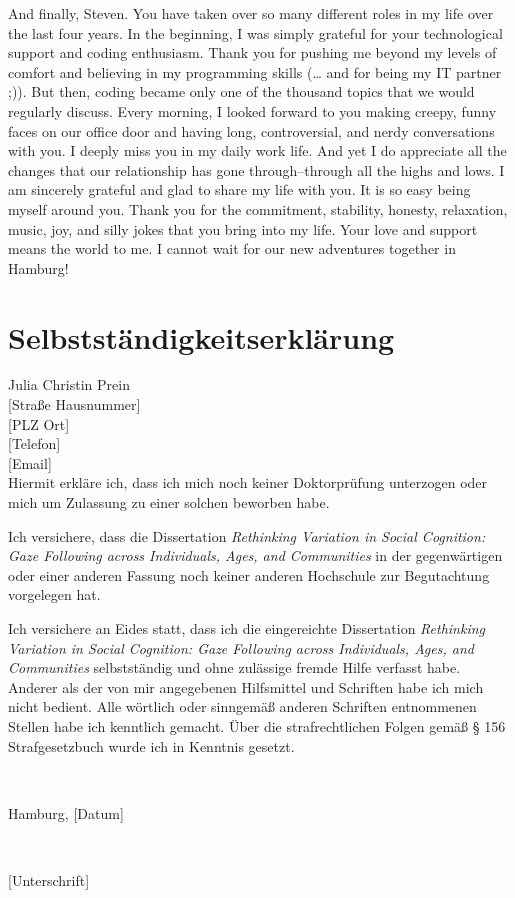 \documentclass[
]{scrbook}
\begin{document}
And finally, Steven. You have taken over so many different roles in my life over the last four years. In the beginning, I was simply grateful for your technological support and coding enthusiasm. Thank you for pushing me beyond my levels of comfort and believing in my programming skills (\ldots{} and for being my IT partner ;)). But then, coding became only one of the thousand topics that we would regularly discuss. Every morning, I looked forward to you making creepy, funny faces on our office door and having long, controversial, and nerdy conversations with you. I deeply miss you in my daily work life. And yet I do appreciate all the changes that our relationship has gone through\thinspace --\thinspace through all the highs and lows. I am sincerely grateful and glad to share my life with you. It is so easy being myself around you. Thank you for the commitment, stability, honesty, relaxation, music, joy, and silly jokes that you bring into my life. Your love and support means the world to me. I cannot wait for our new adventures together in Hamburg!

\chapter*{Selbstständigkeitserklärung}\label{selbststaendigkeit}

Julia Christin Prein\\
{[}Straße Hausnummer{]}\\
{[}PLZ Ort{]}\\
{[}Telefon{]}\\
{[}Email{]}\\

Hiermit erkläre ich, dass ich mich noch keiner Doktorprüfung unterzogen oder mich um Zulassung zu einer solchen beworben habe.

Ich versichere, dass die Dissertation \emph{Rethinking Variation in Social Cognition: Gaze Following across Individuals, Ages, and Communities} in der gegenwärtigen oder einer anderen Fassung noch keiner anderen Hochschule zur Begutachtung vorgelegen hat.

Ich versichere an Eides statt, dass ich die eingereichte Dissertation \emph{Rethinking Variation in Social Cognition: Gaze Following across Individuals, Ages, and Communities} selbstständig und ohne zulässige fremde Hilfe verfasst habe. Anderer als der von mir angegebenen Hilfsmittel und Schriften habe ich mich nicht bedient. Alle wörtlich oder sinngemäß anderen Schriften entnommenen Stellen habe ich kenntlich gemacht. Über die strafrechtlichen Folgen gemäß § 156 Strafgesetzbuch wurde ich in Kenntnis gesetzt.

~

Hamburg, {[}Datum{]}

~

{[}Unterschrift{]}
\end{document}
